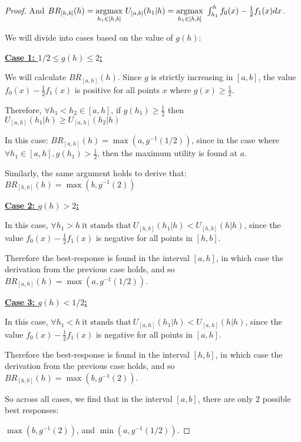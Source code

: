 \begin{proof}
    And $BR_{[h,b]}(h) = \underset{h_1 \in [h,b]}{\operatorname*{argmax}} \ U_{[a,b]}(h_1|h) =  \underset{h_1 \in [h,b]}{\operatorname*{argmax}} \  \int_{h_1}^h f_0(x) - \frac{1}{2}f_1(x) dx $.

    We will divide into cases based on the value of $g(h)$:

    \underline{\textbf{Case 1: $1/2 \le g(h) \le 2$:}}

    We will calculate $BR_{[a,h]}(h)$.
    Since $g$ is strictly increasing in $[a,b]$, the value $f_0(x) - \frac{1}{2}f_1(x)$ is positive for all points $x$ where $g(x) \ge \frac{1}{2}$. 
    
    Therefore, $\forall h_1 < h_2 \in [a,h]$, if $g(h_1) \ge \frac{1}{2}$  then $ U_{[a,h]}(h_1|h) \ge U_{[a,h]}(h_2|h)$
    
    In this case: $BR_{[a,h]}(h)= \max\left(a,g^{-1}\left(1/2 \right)\right)$, since in the case where  $\forall h_1 \in [a,h], g(h_1) > \frac{1}{2}$, then the maximum utility is found at $a$. 
    
    Similarly, the same argument holds to derive that: $BR_{[h,b]}(h) = \max\left(b,g^{-1}\left(2 \right)\right) $
    
    
    \underline{\textbf{Case 2: $g(h) > 2 $:}}
    
    In this case, $\forall h_1 > h \ \text{it stands that} \ U_{[h,b]}(h_1|h) < U_{[h,b]}(h|h)$, since the value $f_0(x) - \frac{1}{2}f_1(x)$ is negative for all points in $[h,b]$.

    Therefore the best-response is found in the interval $[a,h]$, in which case the derivation from the previous case holds, and 
    so $BR_{[a,h]}(h)= \max\left(a,g^{-1}\left(1/2 \right)\right)$.
    
    \underline{\textbf{Case 3: $g(h) < 1/2$:}}
    
    In this case, $\forall h_1 < h \ \text{it stands that} \  U_{[a,h]}(h_1|h) < U_{[a,h]}(h|h)$, since the value $f_0(x) - \frac{1}{2}f_1(x)$ is negative for all points in $[a,h]$.

    Therefore the best-response is found in the interval $[h,b]$, in which case the derivation from the previous case holds, and 
    so $BR_{[h,b]}(h) = \max\left(b,g^{-1}\left(2 \right)\right) $.

    So across all cases, we find that in the interval $[a,b]$, there are only 2 possible best responses: 
    
    $\max\left(b,g^{-1}\left(2 \right)\right)$, and $\min\left(a,g^{-1}\left(1/2 \right)\right) $. 

   
\end{proof}

